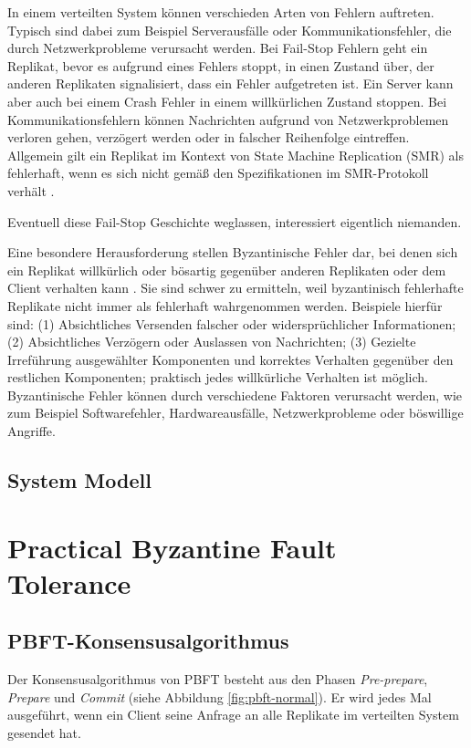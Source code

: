 \documentclass[nonacm,sigconf,natbib=false]{acmart}
\begin{document}
In einem verteilten System können verschieden Arten von Fehlern auftreten. Typisch sind dabei zum Beispiel Serverausfälle oder Kommunikationsfehler, die durch Netzwerkprobleme verursacht werden. Bei Fail-Stop Fehlern\cite{smr-schneider} geht ein Replikat, bevor es aufgrund eines Fehlers stoppt, in einen Zustand über, der anderen Replikaten signalisiert, dass ein Fehler aufgetreten ist. Ein Server kann aber auch bei einem Crash Fehler in einem willkürlichen Zustand stoppen. Bei Kommunikationsfehlern können Nachrichten aufgrund von Netzwerkproblemen verloren gehen, verzögert werden oder in falscher Reihenfolge eintreffen. Allgemein gilt ein Replikat im Kontext von State Machine Replication (SMR) als fehlerhaft, wenn es sich nicht gemäß den Spezifikationen im SMR-Protokoll verhält \cite{smr-schneider}.

Eventuell diese Fail-Stop Geschichte weglassen, interessiert eigentlich niemanden.

Eine besondere Herausforderung stellen Byzantinische Fehler dar, bei denen sich ein Replikat willkürlich oder bösartig gegenüber anderen Replikaten oder dem Client verhalten kann \cite{smr-schneider}. Sie sind schwer zu ermitteln, weil byzantinisch fehlerhafte Replikate nicht immer als fehlerhaft wahrgenommen werden. Beispiele hierfür sind: (1) Absichtliches Versenden falscher oder widersprüchlicher Informationen; (2) Absichtliches Verzögern oder Auslassen von Nachrichten; (3) Gezielte Irreführung ausgewählter Komponenten und korrektes Verhalten gegenüber den restlichen Komponenten; praktisch jedes willkürliche Verhalten ist möglich. Byzantinische Fehler können durch verschiedene Faktoren verursacht werden, wie zum Beispiel Softwarefehler, Hardwareausfälle, Netzwerkprobleme oder böswillige Angriffe.

\subsection{System Modell}

\section{Practical Byzantine Fault Tolerance}

\subsection{PBFT-Konsensusalgorithmus}

Der Konsensusalgorithmus von PBFT besteht aus den Phasen \emph{Pre-prepare}, \emph{Prepare} und \emph{Commit} (siehe Abbildung \ref{fig:pbft-normal}). Er wird jedes Mal ausgeführt, wenn ein Client seine Anfrage an alle Replikate im verteilten System gesendet hat.
\end{document}
